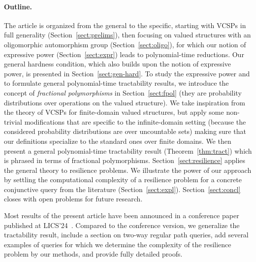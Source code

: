\documentclass[nonacm]{acmart}
\begin{document}
\paragraph{Outline.} The article is organized from the general to the specific, starting with VCSPs in full generality (Section~\ref{sect:prelims}), then focusing on valued structures with an oligomorphic automorphism group (Section~\ref{sect:oligo}), for which our notion of expressive power (Section~\ref{sect:expr}) leads to polynomial-time reductions. Our general hardness condition, which also builds upon the notion of expressive power, is presented in Section~\ref{sect:gen-hard}. 
To study the expressive power and to formulate general polynomial-time tractability results, we introduce the concept of \emph{fractional polymorphisms} in Section~\ref{sect:fpol} (they are probability distributions over operations on the valued structure). 
We take inspiration from the theory of VCSPs for finite-domain valued structures, but apply some non-trivial modifications that are specific to the infinite-domain setting (because the considered probability distributions are over uncountable sets) making sure that our definitions specialize to the standard ones over finite domains.
We then present a general polynomial-time tractability result (Theorem~\ref{thm:tract}) which is phrased in terms of fractional polymorphisms. Section~\ref{sect:resilience} applies the general theory to resilience problems. We illustrate the power of our approach by settling the computational complexity of a resilience problem for a concrete conjunctive query from the literature (Section~\ref{sect:expl}). 
Section~\ref{sect:concl} closes with open problems for future research.

Most results of the present article have been announced in a conference paper published at LICS'24~\cite{Resilience-VCSPs}. Compared to the conference version, we generalize the tractability result, include a section on two-way regular path queries,  add several examples of queries for which we determine the complexity of the resilience problem by our methods, and provide fully detailed proofs.
\end{document}

